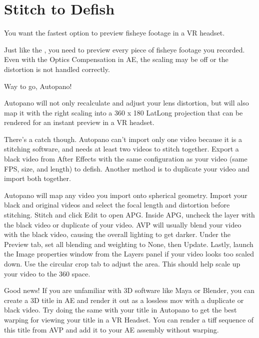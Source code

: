 \section{Stitch to Defish}
\pagecolor{white}
\label{chap:52}
\begin{fullwidth}

\problem

{\large You want the fastest option to preview fisheye footage in a VR headset. \par}

Just like the \textbf{}, you need to preview every piece of fisheye footage you recorded. Even with the Optics Compensation in AE, the scaling may be off or the distortion is not handled correctly.

\solution

{\large Way to go, Autopano! \par}

Autopano will not only recalculate and adjust your lens distortion, but will also map it with the right scaling into a 360 x 180 LatLong projection that can be rendered for an instant preview in a VR headset.

There’s a catch though. Autopano can’t import only one video because it is a stitching software, and needs at least two videos to stitch together. Export a black video from After Effects with the same configuration as your video (same FPS, size, and length) to defish. Another method is to duplicate your video and import both together.


Autopano will map any video you import onto spherical geometry. Import your black and original videos and select the focal length and distortion before stitching. Stitch and click Edit to open APG. Inside APG, uncheck the layer with the black video or duplicate of your video. AVP will usually blend your video with the black video, causing the overall lighting to get darker. Under the Preview tab, set all blending and weighting to None, then Update. Lastly, launch the Image properties window from the Layers panel if your video looks too scaled down. Use the circular crop tab to adjust the area. This should help scale up your video to the 360 space.




Good news! If you are unfamiliar with 3D software like Maya or Blender, you can create a 3D title in AE and render it out as a lossless mov with a duplicate or black video. Try doing the same with your title in Autopano to get the best warping for viewing your title in a VR Headset. You can render a tiff sequence of this title from AVP and add it to your AE assembly without warping.


\clearpage
\end{fullwidth}